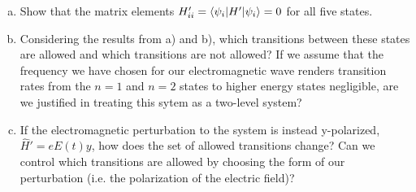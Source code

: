 \documentclass[10pt,letterpaper]{article}
\begin{document}
\begin{enumerate}
\begin{enumerate}[a)]
\color{violet}
For $\hat{H}_{100, 100}'$, the transition energy would be 0, since there's no transition happening. For $\hat{H}_{200, 100}$, the transition energy is
\begin{gather*}
\braket{\psi_{200} | \hat{H}' | \psi_{100}} = \braket{\psi_{200} | eE(t)z | \psi_{100}} = eE(t)z \braket{\psi_{200} | z | \psi_{100}} = 0
\end{gather*}
Along the z-axis, both wavefunctions are symmetric, so the end result is 0. For $\hat{H}_{210, 100}$, the transition energy is
\begin{gather*}
	content...
\end{gather*}
\color{black}

\item Show that the matrix elements $H_{ii}' = \braket{\psi_{i} | H' | \psi_{i}} = 0$ for all five states.

\item Considering the results from a) and b), which transitions between these states are allowed and which transitions are not allowed? If we assume that the frequency we have chosen for our electromagnetic wave renders transition rates from the $n = 1$ and $n = 2$ states to higher energy states negligible, are we justified in treating this sytem as a two-level system?

\item If the electromagnetic perturbation to the system is instead y-polarized, $\hat{H}' = eE(t)y$, how does the set of allowed transitions change? Can we control which transitions are allowed by choosing the form of our perturbation (i.e. the polarization of the electric field)? 

\end{enumerate}

\end{enumerate}
\end{document}
